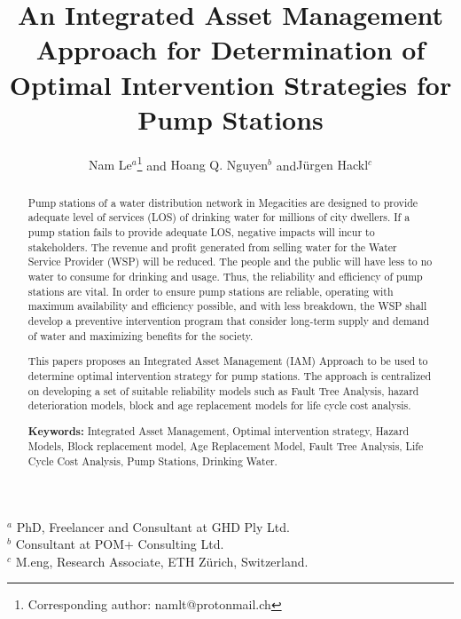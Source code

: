 \documentclass[fleqn]{article}
\begin{document}
	
	\title{\vspace{-5mm}\fontsize{14pt}{10pt}\selectfont\textbf{An Integrated Asset Management Approach for Determination of Optimal Intervention Strategies for Pump Stations}} %
	\author{
		\large
		\textrm{Nam Le$^{a}$}\thanks{Corresponding author: namlt@protonmail.ch} \hspace{2mm}  and \textrm{Hoang Q. Nguyen$^{b}$} and\hspace{2mm}\textrm{J\"{u}rgen Hackl$^{c}$} %
	}
	\date{}
	\maketitle
	
	\textrm{$^{a}$ PhD, Freelancer and Consultant at GHD Ply Ltd.} \\ %
	\textrm{$^{b}$ Consultant at POM+ Consulting Ltd.} \\ %
	\textrm{$^{c}$ M.eng, Research Associate, ETH Z\"{u}rich, Switzerland.} \\ %
	
	\thispagestyle{fancy}
	
	\begin{abstract}
		Pump stations of a water distribution network in Megacities are designed to provide adequate level of services (LOS) of drinking water for millions of city dwellers. If a pump station fails to provide adequate LOS, negative impacts will incur to stakeholders. The revenue and profit generated from selling water for the Water Service Provider (WSP) will be reduced. The people and the public will have less to no water to consume for drinking and usage. Thus, the reliability and efficiency of pump stations are vital. In order to ensure pump stations are reliable, operating with maximum availability and efficiency possible, and with less breakdown, the WSP shall develop a preventive intervention program that consider long-term supply and demand of water and maximizing benefits for the society. 

		This papers proposes an Integrated Asset Management (IAM) Approach to be used to determine optimal intervention strategy for pump stations. The approach is centralized on developing a set of suitable reliability models such as Fault Tree Analysis, hazard deterioration models, block and age replacement models for life cycle cost analysis. 
		
		
		\bigskip
		
		{\bf Keywords:} Integrated Asset Management, Optimal intervention strategy, Hazard Models, Block replacement model, Age Replacement Model, Fault Tree Analysis, Life Cycle Cost Analysis, Pump Stations, Drinking Water.\bigskip
	\end{abstract}
	
	
	
	 
	


	
\end{document}
